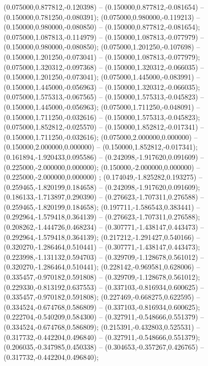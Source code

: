  (0.075000,0.877812,-0.120398) -- (0.150000,0.877812,-0.081654) -- (0.150000,0.781250,-0.080391);
 (0.075000,0.980000,-0.119213) -- (0.150000,0.980000,-0.080850) -- (0.150000,0.877812,-0.081654);
 (0.075000,1.087813,-0.114979) -- (0.150000,1.087813,-0.077979) -- (0.150000,0.980000,-0.080850);
 (0.075000,1.201250,-0.107698) -- (0.150000,1.201250,-0.073041) -- (0.150000,1.087813,-0.077979);
 (0.075000,1.320312,-0.097368) -- (0.150000,1.320312,-0.066035) -- (0.150000,1.201250,-0.073041);
 (0.075000,1.445000,-0.083991) -- (0.150000,1.445000,-0.056963) -- (0.150000,1.320312,-0.066035);
 (0.075000,1.575313,-0.067565) -- (0.150000,1.575313,-0.045823) -- (0.150000,1.445000,-0.056963);
 (0.075000,1.711250,-0.048091) -- (0.150000,1.711250,-0.032616) -- (0.150000,1.575313,-0.045823);
 (0.075000,1.852812,-0.025570) -- (0.150000,1.852812,-0.017341) -- (0.150000,1.711250,-0.032616);
 (0.075000,2.000000,0.000000) -- (0.150000,2.000000,0.000000) -- (0.150000,1.852812,-0.017341);
 (0.161894,-1.920433,0.095586) -- (0.242098,-1.917620,0.091609) -- (0.225000,-2.000000,0.000000);
 (0.150000,-2.000000,0.000000) -- (0.225000,-2.000000,0.000000) ;
 (0.174049,-1.825282,0.193275) -- (0.259465,-1.820199,0.184658) -- (0.242098,-1.917620,0.091609);
 (0.186133,-1.713897,0.290390) -- (0.276623,-1.707311,0.276588) -- (0.259465,-1.820199,0.184658);
 (0.197711,-1.586543,0.383441) -- (0.292964,-1.579418,0.364139) -- (0.276623,-1.707311,0.276588);
 (0.208262,-1.444726,0.468234) -- (0.307771,-1.438147,0.443473) -- (0.292964,-1.579418,0.364139);
 (0.217212,-1.291427,0.540166) -- (0.320270,-1.286464,0.510441) -- (0.307771,-1.438147,0.443473);
 (0.223998,-1.131132,0.594703) -- (0.329709,-1.128678,0.561012) -- (0.320270,-1.286464,0.510441);
 (0.228142,-0.969581,0.628006) -- (0.335457,-0.970182,0.591808) -- (0.329709,-1.128678,0.561012);
 (0.229330,-0.813192,0.637553) -- (0.337103,-0.816934,0.600625) -- (0.335457,-0.970182,0.591808);
 (0.227469,-0.668275,0.622595) -- (0.334524,-0.674768,0.586809) -- (0.337103,-0.816934,0.600625);
 (0.222704,-0.540209,0.584300) -- (0.327911,-0.548666,0.551379) -- (0.334524,-0.674768,0.586809);
 (0.215391,-0.432803,0.525531) -- (0.317732,-0.442204,0.496840) -- (0.327911,-0.548666,0.551379);
 (0.206035,-0.347985,0.450338) -- (0.304653,-0.357267,0.426765) -- (0.317732,-0.442204,0.496840);
